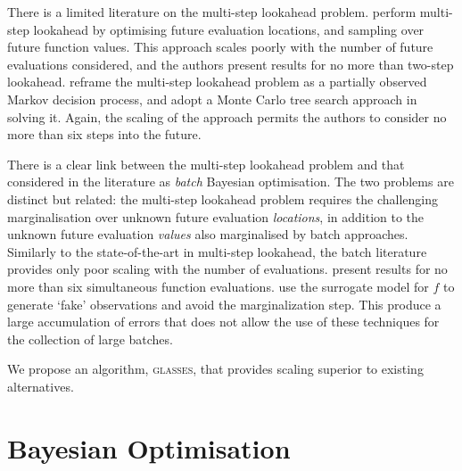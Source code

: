 \documentclass{article} %
\newcommand{\acr}[1]{\textsc{#1}\xspace}
\newcommand{\us}{\acr{glasses}}
\begin{document}
There is a limited literature on the multi-step lookahead problem.
\cite{osborne_gaussian_2009} perform multi-step lookahead by optimising future evaluation locations, and sampling over future function values. 
This approach scales poorly with the number of future evaluations considered, and the authors present results for no more than two-step lookahead.
\cite{Marchant*Ramos*Sanner*2014} reframe the multi-step lookahead problem as a partially observed Markov decision process, and adopt a Monte Carlo tree search approach in solving it. 
Again, the scaling of the approach permits the authors to consider no more than six steps into the future. 

There is a clear link between the multi-step lookahead problem and that considered in the literature as \emph{batch} Bayesian optimisation. 
The two problems are distinct but related: the multi-step lookahead problem requires the challenging marginalisation over unknown future evaluation \emph{locations}, in addition to the unknown future evaluation \emph{values} also marginalised by batch approaches. 
Similarly to the state-of-the-art in multi-step lookahead, the batch literature provides only poor scaling with the number of evaluations.
\cite{Ginsbourger2009} present results for no more than six simultaneous function evaluations.
\cite{Azimi2011,Azimi2012} use the surrogate model for $f$ to generate `fake' observations and avoid the marginalization step. 
This produce a large accumulation of errors that does not allow the use of these techniques for the collection of large batches.

We propose an algorithm, \us, that provides scaling superior to existing alternatives.

\section{Bayesian Optimisation} %
\label{sec:bayesian_optimisation}

\cite{Lizotte_2008}
\cite{Jones_2001}
\cite{Snoek*Larochelle*Adams_2012}
\cite{Brochu*Cora*DeFreitas_2010}


\end{document}
